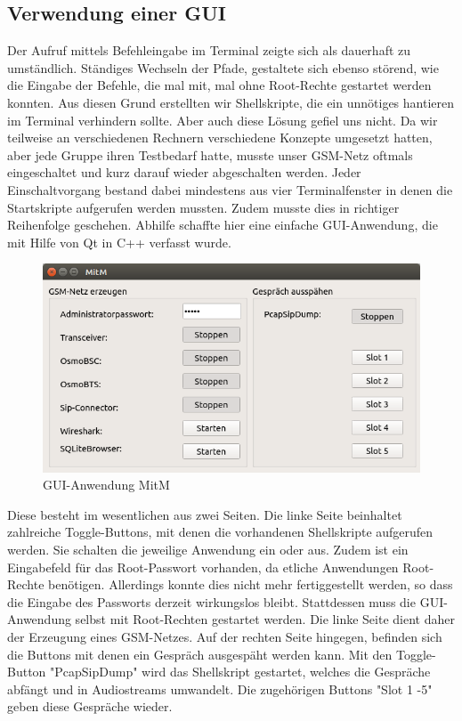 
\subsection{Verwendung einer GUI}

Der Aufruf mittels Befehleingabe im Terminal zeigte sich als dauerhaft zu umständlich. Ständiges Wechseln der Pfade, gestaltete sich ebenso störend, wie die Eingabe der Befehle, die mal mit, mal ohne Root-Rechte gestartet werden konnten. Aus diesen Grund erstellten wir Shellskripte, die ein unnötiges hantieren im Terminal verhindern sollte. Aber auch diese Lösung gefiel uns nicht. Da wir teilweise an verschiedenen Rechnern verschiedene Konzepte umgesetzt hatten, aber jede Gruppe ihren Testbedarf hatte, musste unser GSM-Netz oftmals eingeschaltet und kurz darauf wieder abgeschalten werden. Jeder Einschaltvorgang bestand dabei mindestens aus vier Terminalfenster in denen die Startskripte aufgerufen werden mussten. Zudem musste dies in richtiger Reihenfolge geschehen. Abhilfe schaffte hier eine einfache GUI-Anwendung, die mit Hilfe von Qt in C++ verfasst wurde.  

\begin{figure}[h] %
\centering
\includegraphics[width=15cm]{includes/gui}
\caption{GUI-Anwendung MitM}
\label{fig:GUI}
\end{figure}


Diese besteht im wesentlichen aus zwei Seiten. Die linke Seite beinhaltet zahlreiche Toggle-Buttons, mit denen die vorhandenen Shellskripte aufgerufen werden. Sie schalten die jeweilige Anwendung ein oder aus. Zudem ist ein Eingabefeld für das Root-Passwort vorhanden, da etliche Anwendungen Root-Rechte benötigen. Allerdings konnte dies nicht mehr fertiggestellt werden, so dass die Eingabe des Passworts derzeit wirkungslos bleibt. Stattdessen muss die GUI-Anwendung selbst mit Root-Rechten gestartet werden. Die linke Seite dient daher der Erzeugung eines GSM-Netzes. 
Auf der rechten Seite hingegen, befinden sich die Buttons mit denen ein Gespräch ausgespäht werden kann. Mit den Toggle-Button "PcapSipDump" wird das Shellskript gestartet, welches die Gespräche abfängt und in Audiostreams umwandelt. Die zugehörigen Buttons "Slot 1 -5" geben diese Gespräche wieder. 
